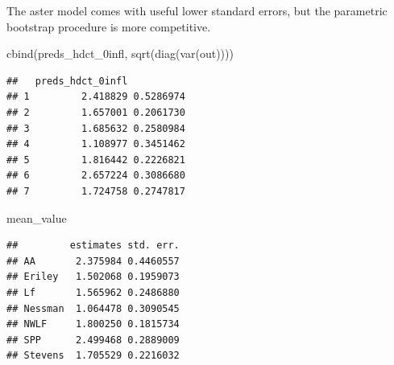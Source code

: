 \documentclass[
  ignorenonframetext,
]{beamer}
\newenvironment{Shaded}{\begin{snugshade}}{\end{snugshade}}
\newcommand{\FunctionTok}[1]{\textcolor[rgb]{0.00,0.00,0.00}{#1}}
\newcommand{\NormalTok}[1]{#1}
\begin{document}
\begin{frame}[fragile]{}
\protect\hypertarget{section-49}{}
The aster model comes with useful lower standard errors, but the
parametric bootstrap procedure is more competitive.

\vspace{12pt}
\tiny

\begin{Shaded}
\begin{Highlighting}[]
\FunctionTok{cbind}\NormalTok{(preds\_hdct\_0infl, }\FunctionTok{sqrt}\NormalTok{(}\FunctionTok{diag}\NormalTok{(}\FunctionTok{var}\NormalTok{(out))))}
\end{Highlighting}
\end{Shaded}

\begin{verbatim}
##   preds_hdct_0infl          
## 1         2.418829 0.5286974
## 2         1.657001 0.2061730
## 3         1.685632 0.2580984
## 4         1.108977 0.3451462
## 5         1.816442 0.2226821
## 6         2.657224 0.3086680
## 7         1.724758 0.2747817
\end{verbatim}

\begin{Shaded}
\begin{Highlighting}[]
\NormalTok{mean\_value}
\end{Highlighting}
\end{Shaded}

\begin{verbatim}
##         estimates std. err.
## AA       2.375984 0.4460557
## Eriley   1.502068 0.1959073
## Lf       1.565962 0.2486880
## Nessman  1.064478 0.3090545
## NWLF     1.800250 0.1815734
## SPP      2.499468 0.2889009
## Stevens  1.705529 0.2216032
\end{verbatim}
\end{frame}
\end{document}
